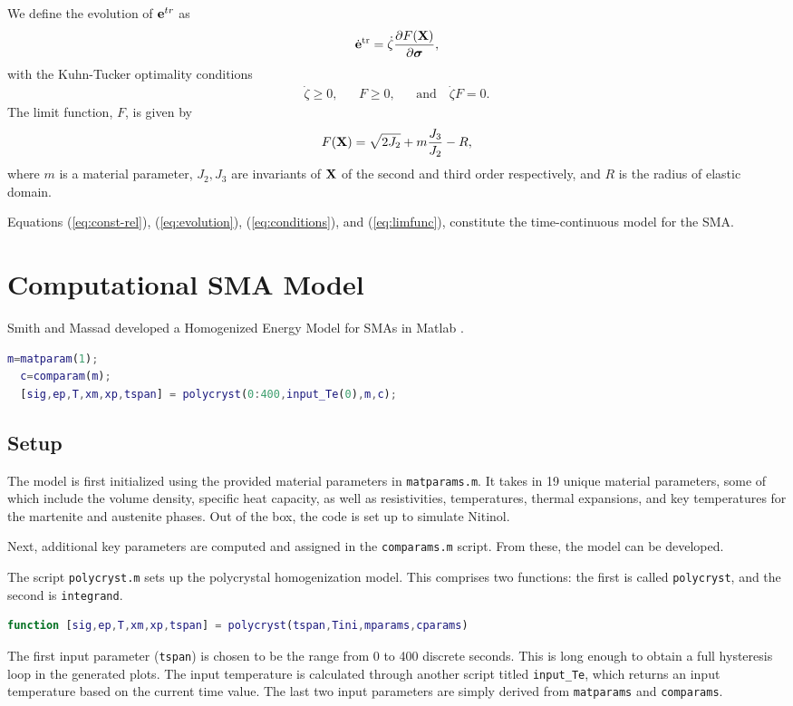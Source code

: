 \begin{multicols}{2}
We define the evolution of $\vb{e}^{tr}$ as
\begin{align}
    \dot{\vb{e}}^\mathrm{tr}=\dot\zeta\pdv{F(\vb{X})}{\bm{\sigma}},\label{eq:evolution}
\end{align}
with the Kuhn-Tucker optimality conditions
\begin{align}
    \dot\zeta\geq0, && F\geq0, &&\textrm{and} \quad \dot\zeta F=0.\label{eq:conditions}
\end{align}
The limit function, $F$, is given by\begin{align}
    F(\vb{X})=\sqrt{2J_2}+m\frac{J_3}{J_2}-R,\label{eq:limfunc}
\end{align}
where $m$ is a material parameter, $J_2,J_3$ are invariants of $\vb{X}$ of the second and third order respectively, and $R$ is the radius of elastic domain. 

Equations 
(\ref{eq:const-rel}),
(\ref{eq:evolution}), (\ref{eq:conditions}), and
(\ref{eq:limfunc}), constitute the time-continuous model for the SMA.

\section{Computational SMA Model}
Smith and Massad developed a Homogenized Energy Model for SMAs in Matlab \cite{smith2004model}.
\begin{lstlisting}[language=matlab, caption=Contents of main file]
  m=matparam(1);
  c=comparam(m);
  [sig,ep,T,xm,xp,tspan] = polycryst(0:400,input_Te(0),m,c);
\end{lstlisting}
\subsection{Setup}
The model is first initialized using the provided material parameters in \texttt{matparams.m}. It takes in 19 unique material parameters, some of which include the volume density, specific heat capacity, as well as resistivities, temperatures, thermal expansions, and key temperatures for the martenite and austenite phases.
Out of the box, the code is set up to simulate Nitinol.

 Next, additional key parameters are computed and assigned in the \texttt{comparams.m} script. From these, the model can be developed.

The script \texttt{polycryst.m} sets up the polycrystal homogenization model. This comprises two functions: the first is called \texttt{polycryst}, and the second is \texttt{integrand}. 
\begin{lstlisting}[language=matlab, caption=Polycryst function parameters]
function [sig,ep,T,xm,xp,tspan] = polycryst(tspan,Tini,mparams,cparams)
\end{lstlisting}
The first input parameter (\texttt{tspan}) is chosen to be the range from 0 to 400 discrete seconds. This is long enough to obtain a full hysteresis loop in the generated plots. The input temperature is calculated through another script titled \texttt{input\_Te}, which returns an input temperature based on the current time value. The last two input parameters are simply derived from \texttt{matparams} and \texttt{comparams}. 


\end{multicols}
